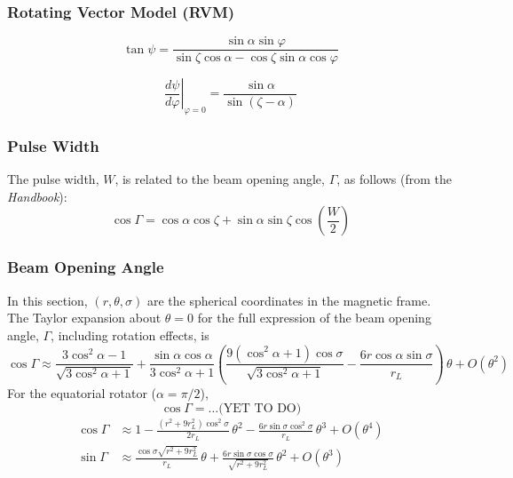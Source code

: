 \documentclass{article}
\newcommand{\phase}{\varphi}
\begin{document}
\subsubsection{Rotating Vector Model (RVM)}

\begin{equation}
    \tan{\psi} = \frac{\sin\alpha \sin\phase}{\sin\zeta\cos\alpha - \cos\zeta\sin\alpha\cos\phase}
\end{equation}

\begin{equation}
    \left.\frac{d\psi}{d\phase}\right|_{\phase=0} = \frac{\sin\alpha}{\sin(\zeta-\alpha)}
\end{equation}

\subsubsection{Pulse Width}

The pulse width, $W$, is related to the beam opening angle, $\Gamma$, as follows (from the \emph{Handbook}):
\begin{equation}
    \cos\Gamma = \cos\alpha\cos\zeta + \sin\alpha\sin\zeta\cos\left(\frac{W}{2}\right)
    \tag{H3.27}
\end{equation}

\subsubsection{Beam Opening Angle}

In this section, $(r,\theta,\sigma)$ are the spherical coordinates in the magnetic frame.
The Taylor expansion about $\theta = 0$ for the full expression of the beam opening angle, $\Gamma$, including rotation effects, is
\begin{equation}
    \cos\Gamma \approx \frac{3\cos^2\alpha-1}{\sqrt{3\cos^2\alpha + 1}} +
                   \frac{\sin\alpha\cos\alpha}{3\cos^2\alpha + 1}
                   \left(\frac{9(\cos^2\alpha+1)\cos\sigma}{\sqrt{3\cos^2\alpha+1}} -
                         \frac{6r\cos\alpha\sin\sigma}{r_L}\right) \,\theta +
                   O(\theta^2)
\end{equation}
For the equatorial rotator ($\alpha = \pi/2$),
\begin{equation}
    \cos\Gamma = \dots \text{(YET TO DO)}
\end{equation}
\begin{equation}
    \begin{aligned}
        \cos\Gamma &\approx 1 - \frac{(r^2+9r_L^2)\cos^2\sigma}{2r_L}\,\theta^2
                              - \frac{6r\sin\sigma\cos^2\sigma}{r_L}\,\theta^3 +
                              O(\theta^4) \\
        \sin\Gamma &\approx \frac{\cos\sigma\sqrt{r^2+9r_L^2}}{r_L}\,\theta +
                            \frac{6r\sin\sigma\cos\sigma}{\sqrt{r^2+9r_L^2}}\,\theta^2 +
                            O(\theta^3)
    \end{aligned}
\end{equation}
\end{document}
